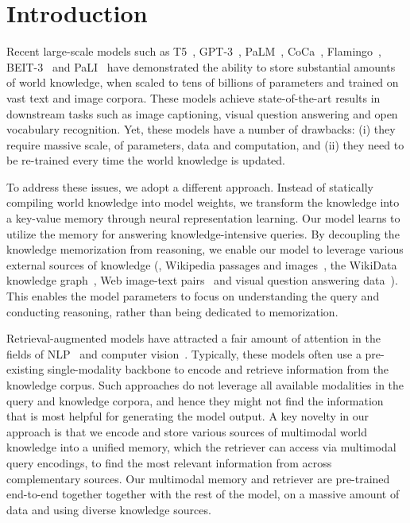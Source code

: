 \documentclass[10pt,twocolumn,letterpaper]{article}
\begin{document}
\section{Introduction}\label{sec:introduction}



Recent large-scale models such as T5~\cite{DBLP:journals/jmlr/RaffelSRLNMZLL20}, GPT-3~\cite{DBLP:conf/nips/BrownMRSKDNSSAA20}, PaLM~\cite{DBLP:journals/corr/abs-2204-02311}, CoCa~\cite{DBLP:journals/corr/abs-2205-01917}, Flamingo~\cite{DBLP:journals/corr/abs-2204-14198},  BEIT-3~\cite{DBLP:journals/corr/abs-2208-10442}
and PaLI~\cite{DBLP:journals/corr/abs-2209-06794} 
have demonstrated the ability to store substantial amounts of world knowledge, when scaled to tens of billions of parameters and trained on vast text and image corpora. These models achieve state-of-the-art results in downstream tasks such as image captioning, visual question answering and open vocabulary recognition. 
Yet, these models have a number of drawbacks: (i) they require massive scale, of parameters, data and computation,
and (ii) they need to be re-trained every time the world knowledge is updated.




To address these issues, we adopt a different approach. Instead of statically compiling world knowledge into model weights, we transform the knowledge into a key-value memory through neural representation learning. Our model learns to utilize the memory for answering knowledge-intensive queries. By decoupling the knowledge memorization from reasoning, we enable our model to leverage various external sources of knowledge (\eg, Wikipedia passages and images~\cite{DBLP:conf/sigir/Srinivasan0CBN21}, the WikiData knowledge graph~\cite{DBLP:journals/cacm/VrandecicK14}, Web image-text pairs~\cite{changpinyo2021cc12m} and visual question answering data~\cite{DBLP:journals/ijcv/GoyalKASBP19}). This enables the model parameters to focus on understanding the query and conducting reasoning, rather than being dedicated to memorization. 

Retrieval-augmented models have attracted a fair amount of attention in the fields of NLP~\cite{DBLP:journals/corr/abs-2002-08909, DBLP:journals/corr/abs-2208-03299} and computer vision~\cite{DBLP:conf/cvpr/Long0ANPGBSH22, DBLP:conf/naacl/GuiWH0BG22}. Typically, these models often use a pre-existing single-modality backbone to encode and retrieve information from the knowledge corpus. Such approaches do not leverage all available modalities in the query and knowledge corpora, and hence they might not find the information that is most helpful for generating the model output. A key novelty in our approach is that we encode and store various sources of multimodal world knowledge into a unified memory, which the retriever can access via multimodal query encodings, to find the most relevant information from across complementary sources. Our multimodal memory and retriever are pre-trained end-to-end together together with the rest of the model, on a massive amount of data and using diverse knowledge sources.
\end{document}
